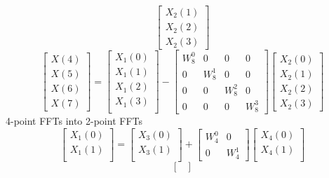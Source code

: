 \documentclass[journal,12pt,twocolumn]{IEEEtran}
\numberwithin{equation}{section}
\renewcommand\thesection{\arabic{section}}
\begin{document}
\begin{enumerate}[label=\arabic*.,ref=\thesection.\theenumi]
\begin{equation}
\begin{bmatrix}
X_{2}(1) \\ 
X_{2}(2) \\
X_{2}(3)
\end{bmatrix}
\end{equation}
\begin{equation}
\begin{bmatrix}
X(4) \\ 
X(5) \\ 
X(6) \\ 
X(7)
\end{bmatrix}
=
\begin{bmatrix}
X_{1}(0) \\ 
X_{1}(1)\\ 
X_{1}(2)\\
X_{1}(3)\\
\end{bmatrix}
-
\begin{bmatrix}
W^{0}_{8} & 0 & 0 & 0\\
0 & W^{1}_{8} & 0 & 0\\
0 & 0 & W^{2}_{8} & 0\\
0 & 0 & 0 & W^{3}_{8}
\end{bmatrix}
\begin{bmatrix}
X_{2}(0) \\ 
X_{2}(1) \\ 
X_{2}(2) \\
X_{2}(3)
\end{bmatrix}
\end{equation}
4-point FFTs into 2-point FFTs
\begin{equation}
\begin{bmatrix}
X_{1}(0) \\ 
X_{1}(1)\\ 
\end{bmatrix}
=
\begin{bmatrix}
X_{3}(0) \\ 
X_{3}(1)\\ 
\end{bmatrix}
+
\begin{bmatrix}
W^{0}_{4} & 0\\
0 & W^{1}_{4}
\end{bmatrix}
\begin{bmatrix}
X_{4}(0) \\ 
X_{4}(1) \\ 
\end{bmatrix}
\end{equation}
\begin{equation}
\begin{bmatrix}

\end{bmatrix}
\end{equation}
\end{enumerate}
\end{document}
